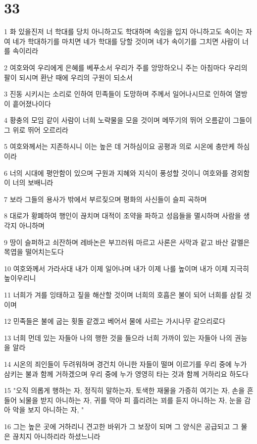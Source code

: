 \chapter{33}

\par 1 화 있을진저 너 학대를 당치 아니하고도 학대하며 속임을 입지 아니하고도 속이는 자여 네가 학대하기를 마치면 네가 학대를 당할 것이며 네가 속이기를 그치면 사람이 너를 속이리라
\par 2 여호와여 우리에게 은혜를 베푸소서 우리가 주를 앙망하오니 주는 아침마다 우리의 팔이 되시며 환난 때에 우리의 구원이 되소서
\par 3 진동 시키시는 소리로 인하여 민족들이 도망하며 주께서 일어나시므로 인하여 열방이 흩어졌나이다
\par 4 황충의 모임 같이 사람이 너희 노략물을 모을 것이며 메뚜기의 뛰어 오름같이 그들이 그 위로 뛰어 오르리라
\par 5 여호와께서는 지존하시니 이는 높은 데 거하심이요 공평과 의로 시온에 충만케 하심이라
\par 6 너의 시대에 평안함이 있으며 구원과 지혜와 지식이 풍성할 것이니 여호와를 경외함이 너의 보배니라
\par 7 보라 그들의 용사가 밖에서 부르짖으며 평화의 사신들이 슬피 곡하며
\par 8 대로가 황폐하여 행인이 끊치며 대적이 조약을 파하고 성읍들을 멸시하며 사람을 생각지 아니하며
\par 9 땅이 슬퍼하고 쇠잔하며 레바논은 부끄러워 마르고 사론은 사막과 같고 바산 갈멜은 목엽을 떨어치는도다
\par 10 여호와께서 가라사대 내가 이제 일어나며 내가 이제 나를 높이며 내가 이제 지극히 높이우리니
\par 11 너희가 겨를 잉태하고 짚을 해산할 것이며 너희의 호흡은 불이 되어 너희를 삼킬 것이며
\par 12 민족들은 불에 굽는 횟돌 같겠고 베어서 물에 사르는 가시나무 같으리로다
\par 13 너희 먼데 있는 자들아 나의 행한 것을 들으라 너희 가까이 있는 자들아 나의 권능을 알라
\par 14 시온의 죄인들이 두려워하며 경건치 아니한 자들이 떨며 이르기를 우리 중에 누가 삼키는 불과 함께 거하겠으며 우리 중에 누가 영영히 타는 것과 함께 거하리요 하도다
\par 15 "오직 의롭게 행하는 자, 정직히 말하는자, 토색한 재물을 가증히 여기는 자, 손을 흔들어 뇌물을 받지 아니하는 자, 귀를 막아 피 흘리려는 꾀를 듣지 아니하는 자, 눈을 감아 악을 보지 아니하는 자, "
\par 16 그는 높은 곳에 거하리니 견고한 바위가 그 보장이 되며 그 양식은 공급되고 그 물은 끊치지 아니하리라 하셨느니라
